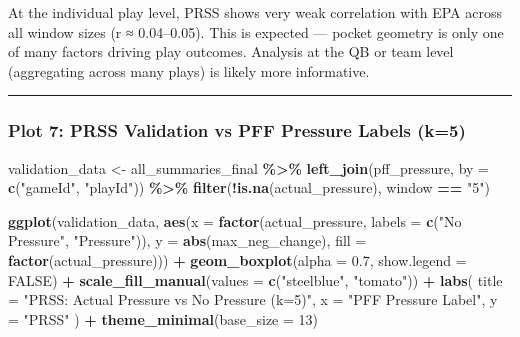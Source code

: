 \documentclass[
]{article}
\newenvironment{Shaded}{\begin{snugshade}}{\end{snugshade}}
\newcommand{\AttributeTok}[1]{\textcolor[rgb]{0.13,0.29,0.53}{#1}}
\newcommand{\ConstantTok}[1]{\textcolor[rgb]{0.56,0.35,0.01}{#1}}
\newcommand{\DecValTok}[1]{\textcolor[rgb]{0.00,0.00,0.81}{#1}}
\newcommand{\FloatTok}[1]{\textcolor[rgb]{0.00,0.00,0.81}{#1}}
\newcommand{\FunctionTok}[1]{\textcolor[rgb]{0.13,0.29,0.53}{\textbf{#1}}}
\newcommand{\NormalTok}[1]{#1}
\newcommand{\OtherTok}[1]{\textcolor[rgb]{0.56,0.35,0.01}{#1}}
\newcommand{\SpecialCharTok}[1]{\textcolor[rgb]{0.81,0.36,0.00}{\textbf{#1}}}
\newcommand{\StringTok}[1]{\textcolor[rgb]{0.31,0.60,0.02}{#1}}
\begin{document}
At the individual play level, PRSS shows very weak correlation with EPA
across all window sizes (r ≈ 0.04--0.05). This is expected --- pocket
geometry is only one of many factors driving play outcomes. Analysis at
the QB or team level (aggregating across many plays) is likely more
informative.

\begin{center}\rule{0.5\linewidth}{0.5pt}\end{center}

\subsubsection{Plot 7: PRSS Validation vs PFF Pressure Labels
(k=5)}\label{plot-7-prss-validation-vs-pff-pressure-labels-k5}

\begin{Shaded}
\begin{Highlighting}[]
\NormalTok{validation\_data }\OtherTok{\textless{}{-}}\NormalTok{ all\_summaries\_final }\SpecialCharTok{\%\textgreater{}\%}
  \FunctionTok{left\_join}\NormalTok{(pff\_pressure, }\AttributeTok{by =} \FunctionTok{c}\NormalTok{(}\StringTok{"gameId"}\NormalTok{, }\StringTok{"playId"}\NormalTok{)) }\SpecialCharTok{\%\textgreater{}\%}
  \FunctionTok{filter}\NormalTok{(}\SpecialCharTok{!}\FunctionTok{is.na}\NormalTok{(actual\_pressure), window }\SpecialCharTok{==} \StringTok{"5"}\NormalTok{)}

\FunctionTok{ggplot}\NormalTok{(validation\_data,}
       \FunctionTok{aes}\NormalTok{(}\AttributeTok{x =} \FunctionTok{factor}\NormalTok{(actual\_pressure, }\AttributeTok{labels =} \FunctionTok{c}\NormalTok{(}\StringTok{"No Pressure"}\NormalTok{, }\StringTok{"Pressure"}\NormalTok{)),}
           \AttributeTok{y =} \FunctionTok{abs}\NormalTok{(max\_neg\_change),}
           \AttributeTok{fill =} \FunctionTok{factor}\NormalTok{(actual\_pressure))) }\SpecialCharTok{+}
  \FunctionTok{geom\_boxplot}\NormalTok{(}\AttributeTok{alpha =} \FloatTok{0.7}\NormalTok{, }\AttributeTok{show.legend =} \ConstantTok{FALSE}\NormalTok{) }\SpecialCharTok{+}
  \FunctionTok{scale\_fill\_manual}\NormalTok{(}\AttributeTok{values =} \FunctionTok{c}\NormalTok{(}\StringTok{"steelblue"}\NormalTok{, }\StringTok{"tomato"}\NormalTok{)) }\SpecialCharTok{+}
  \FunctionTok{labs}\NormalTok{(}
    \AttributeTok{title =} \StringTok{"PRSS: Actual Pressure vs No Pressure (k=5)"}\NormalTok{,}
    \AttributeTok{x     =} \StringTok{"PFF Pressure Label"}\NormalTok{,}
    \AttributeTok{y     =} \StringTok{"PRSS"}
\NormalTok{  ) }\SpecialCharTok{+}
  \FunctionTok{theme\_minimal}\NormalTok{(}\AttributeTok{base\_size =} \DecValTok{13}\NormalTok{)}
\end{Highlighting}
\end{Shaded}
\end{document}
